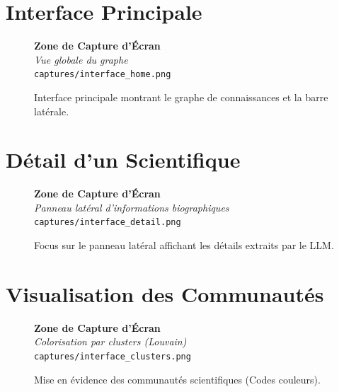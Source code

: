 \documentclass[12pt,a4paper]{report}
\begin{document}
\section{Interface Principale}
\begin{figure}[H]
    \centering
    \begin{tcolorbox}[colback=ice50, colframe=slate100, height=8cm, valign=center, halign=center, sharp corners]
        \color{slate500}
        \textbf{Zone de Capture d'Écran}\\
        \textit{Vue globale du graphe}\\
        \texttt{captures/interface\_home.png}
    \end{tcolorbox}
    \caption{Interface principale montrant le graphe de connaissances et la barre latérale.}
\end{figure}

\section{Détail d'un Scientifique}
\begin{figure}[H]
    \centering
    \begin{tcolorbox}[colback=ice50, colframe=slate100, height=8cm, valign=center, halign=center, sharp corners]
        \color{slate500}
        \textbf{Zone de Capture d'Écran}\\
        \textit{Panneau latéral d'informations biographiques}\\
        \texttt{captures/interface\_detail.png}
    \end{tcolorbox}
    \caption{Focus sur le panneau latéral affichant les détails extraits par le LLM.}
\end{figure}

\section{Visualisation des Communautés}
\begin{figure}[H]
    \centering
    \begin{tcolorbox}[colback=ice50, colframe=slate100, height=8cm, valign=center, halign=center, sharp corners]
        \color{slate500}
        \textbf{Zone de Capture d'Écran}\\
        \textit{Colorisation par clusters (Louvain)}\\
        \texttt{captures/interface\_clusters.png}
    \end{tcolorbox}
    \caption{Mise en évidence des communautés scientifiques (Codes couleurs).}
\end{figure}
\end{document}

